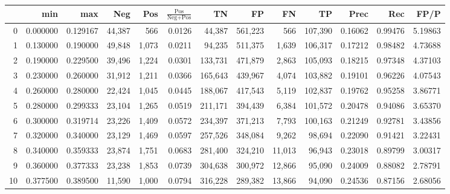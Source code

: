 \begin{tabular}{rrrrrrrrrrrrr}
\toprule
{} &       min &       max &     Neg &    Pos & $\frac{\text{Pos}}{\text{Neg}+\text{Pos}}$ &       TN &       FP &       FN &       TP &     Prec &      Rec &     FP/P \\
\midrule
0  &  0.000000 &  0.129167 &  44,387 &    566 &                                     0.0126 &   44,387 &  561,223 &      566 &  107,390 &  0.16062 &  0.99476 &  5.19863 \\
1  &  0.130000 &  0.190000 &  49,848 &  1,073 &                                     0.0211 &   94,235 &  511,375 &    1,639 &  106,317 &  0.17212 &  0.98482 &  4.73688 \\
2  &  0.190000 &  0.229500 &  39,496 &  1,224 &                                     0.0301 &  133,731 &  471,879 &    2,863 &  105,093 &  0.18215 &  0.97348 &  4.37103 \\
3  &  0.230000 &  0.260000 &  31,912 &  1,211 &                                     0.0366 &  165,643 &  439,967 &    4,074 &  103,882 &  0.19101 &  0.96226 &  4.07543 \\
4  &  0.260000 &  0.280000 &  22,424 &  1,045 &                                     0.0445 &  188,067 &  417,543 &    5,119 &  102,837 &  0.19762 &  0.95258 &  3.86771 \\
5  &  0.280000 &  0.299333 &  23,104 &  1,265 &                                     0.0519 &  211,171 &  394,439 &    6,384 &  101,572 &  0.20478 &  0.94086 &  3.65370 \\
6  &  0.300000 &  0.319714 &  23,226 &  1,409 &                                     0.0572 &  234,397 &  371,213 &    7,793 &  100,163 &  0.21249 &  0.92781 &  3.43856 \\
7  &  0.320000 &  0.340000 &  23,129 &  1,469 &                                     0.0597 &  257,526 &  348,084 &    9,262 &   98,694 &  0.22090 &  0.91421 &  3.22431 \\
8  &  0.340000 &  0.359333 &  23,874 &  1,751 &                                     0.0683 &  281,400 &  324,210 &   11,013 &   96,943 &  0.23018 &  0.89799 &  3.00317 \\
9  &  0.360000 &  0.377333 &  23,238 &  1,853 &                                     0.0739 &  304,638 &  300,972 &   12,866 &   95,090 &  0.24009 &  0.88082 &  2.78791 \\
10 &  0.377500 &  0.389500 &  11,590 &  1,000 &                                     0.0794 &  316,228 &  289,382 &   13,866 &   94,090 &  0.24536 &  0.87156 &  2.68056 \\

\end{tabular}
